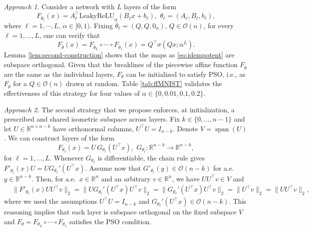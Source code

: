 \documentclass{article}
\theoremstyle{plain}
\theoremstyle{definition}
\theoremstyle{definition}
\theoremstyle{remark}
\theoremstyle{definition}
\theoremstyle{definition}
\theoremstyle{remark}
\numberwithin{equation}{section}
\begin{document}
\makeatletter
\def\@currentlabel{Approach 1}\label{app1}
\makeatother
\textit{Approach 1.} Consider a network with $L$ layers of the form
\[
F_{\theta_\ell}(x) = A^\top_\ell \mathrm{LeakyReLU}_{\alpha}(B_\ell x + b_\ell),\,\,\theta_\ell = (A_\ell,B_\ell,b_\ell),
\]
where $\ell=1,\cdots,L$, $\alpha\in [0,1)$. Fixing $\bar{\theta}_\ell=(Q,Q,0_n)$, $Q\in\mathcal{O}(n)$, for every $\ell=1,...,L$, one can verify that
\begin{equation}\label{eq:idempotent}
F_{\bar{\theta}}(x)=F_{\bar{\theta}_L}\circ \cdots \circ F_{\bar{\theta}_1}(x)  = Q^\top \sigma(Qx;\alpha^L).
\end{equation}
Lemma \ref{lem:second-construction} shows that the maps as \eqref{eq:idempotent} are subspace orthogonal. Given that the breaklines of the piecewise affine function $F_{\bar{\theta}}$ are the same as the individual layers, $F_\theta$ can be initialized to satisfy PSO, i.e., as $F_{\bar{\theta}}$ for a $Q\in\mathcal{O}(n)$ drawn at random. Table \ref{tab:ffMNIST} validates the effectiveness of this strategy for four values of $\alpha\in\{0,0.01,0.1,0.2\}$. 

\makeatletter
\def\@currentlabel{Approach 2}\label{app2}
\makeatother
\textit{Approach 2.} The second strategy that we propose enforces, at initialization, a prescribed and shared isometric subspace across layers. Fix $k\in\{0,\dots,n-1\}$ and let $U\in\mathbb{R}^{n\times n-k}$ have orthonormal columns, $U^\top U=I_{n-k}$. Denote $V=\operatorname{span}(U)$. We can construct layers of the form
\begin{equation}\label{eq:splitOrthogonal}
F_{\theta_\ell}(x)=U\,G_{\theta_{\ell}}(U^\top x),\,\,G_{\theta_{\ell}}:\mathbb{R}^{n-k}\to\mathbb{R}^{n-k},
\end{equation}
for $\ell=1,\dots,L$. Whenever $G_{\theta_{\ell}}$ is differentiable, the chain rule gives $F'_{\theta_\ell}(x)U = U G_{\theta_{\ell}}'(U^\top x)$. Assume now that $G'_{\theta_{\ell}}(y)\in\mathcal{O}(n-k)$ for a.e.\, $y\in\mathbb{R}^{n-k}$. Then, for a.e.\, $x\in\mathbb{R}^n$ and an arbitrary $v\in\mathbb{R}^n$, we have $UU^\top v\in V$ and
\begin{align*}
&\|F'_{\theta_\ell}(x)UU^\top v\|_2
=\|UG_{\theta_{\ell}}'(U^\top x)U^\top v\|_2 =\|G_{\theta_{\ell}}'(U^\top x)U^\top v\|_2=\|U^\top v\|_2=\|UU^\top v\|_2,
\end{align*}
where we used the assumptions $U^\top U=I_{n-k}$ and $G_{\theta_{\ell}}'(U^\top x)\in\mathcal{O}(n-k)$. This reasoning implies that each layer is subspace orthogonal on the fixed subspace $V$ and $F_\theta = F_{\theta_L}\circ \cdots \circ F_{\theta_1}$ satisfies the PSO condition.
\end{document}
